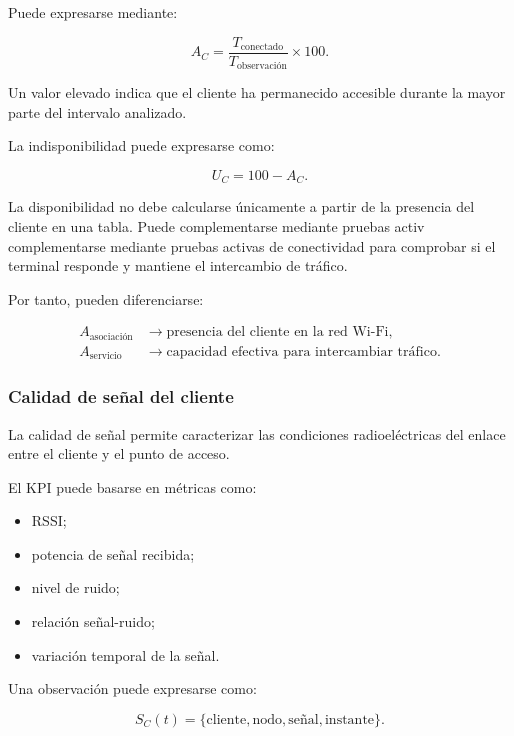 Puede expresarse mediante:

\[
    A_C
    =
    \frac{
        T_{\mathrm{conectado}}
    }{
        T_{\mathrm{observación}}
    }
    \times
    100.
\]

Un valor elevado indica que el cliente ha permanecido accesible durante
la mayor parte del intervalo analizado.

La indisponibilidad puede expresarse como:

\[
    U_C
    =
    100
    -
    A_C.
\]

La disponibilidad no debe calcularse únicamente a partir de la presencia
del cliente en una tabla. Puede complementarse mediante pruebas activ complementarse mediante pruebas activas
de conectividad para comprobar si el terminal responde y mantiene el
intercambio de tráfico.

Por tanto, pueden diferenciarse:

\[
\begin{aligned}
    A_{\mathrm{asociación}}
    &\longrightarrow
    \text{presencia del cliente en la red Wi-Fi},\\
    A_{\mathrm{servicio}}
    &\longrightarrow
    \text{capacidad efectiva para intercambiar tráfico}.
\end{aligned}
\]


\subsubsection*{Calidad de señal del cliente}

La calidad de señal permite caracterizar las condiciones radioeléctricas
del enlace entre el cliente y el punto de acceso.

El KPI puede basarse en métricas como:

\begin{itemize}
    \item RSSI;

    \item potencia de señal recibida;

    \item nivel de ruido;

    \item relación señal-ruido;

    \item variación temporal de la señal.
\end{itemize}

Una observación puede expresarse como:

\[
    S_C(t)
    =
    \{
        \text{cliente},
        \text{nodo},
        \text{señal},
        \text{instante}
    \}.
\]

